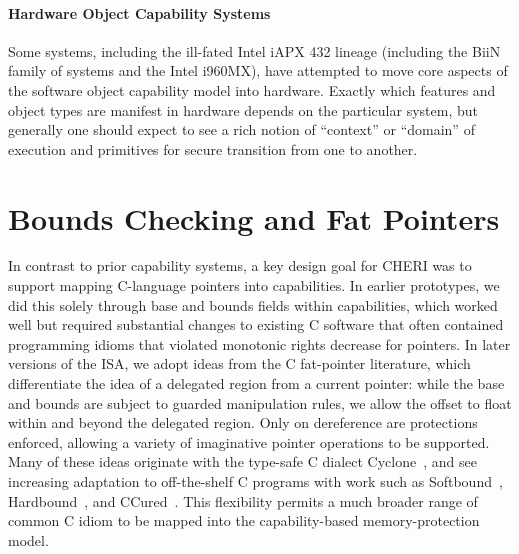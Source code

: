 \paragraph{Hardware Object Capability Systems}

Some systems, including the ill-fated Intel iAPX 432 lineage (including
the BiiN family of systems and the Intel i960MX), have attempted to move
core aspects of the software object capability model into hardware.  Exactly
which features and object types are manifest in hardware depends on the
particular system, but generally one should expect to see a rich notion of
``context'' or ``domain'' of execution and primitives for secure transition
from one to another.



\section{Bounds Checking and Fat Pointers} %

In contrast to prior capability systems, a key design goal for CHERI was to support mapping C-language pointers into capabilities.
In earlier prototypes, we did this solely through base and bounds fields within capabilities, which worked well but required substantial changes to existing C software that often contained programming idioms that violated monotonic rights decrease for pointers.
In later versions of the ISA, we adopt ideas from the C fat-pointer literature, which differentiate the idea of a delegated region from a current pointer: while the base and bounds are subject to guarded manipulation rules, we allow the offset to float within and beyond the delegated region.
Only on dereference are protections enforced, allowing a variety of imaginative pointer operations to be supported.
Many of these ideas originate with the type-safe C dialect Cyclone~\cite{trevor:cyclone}, and see increasing adaptation to off-the-shelf C programs with work such as Softbound~\cite{Nagarakatte:2009:SHC:1542476.1542504}, Hardbound~\cite{Devietti:2008:HAS:1353536.1346295}, and CCured~\cite{Necula:2002:CTR:503272.503286}.
This flexibility permits a much broader range of common C idiom to be mapped into the capability-based memory-protection model.

